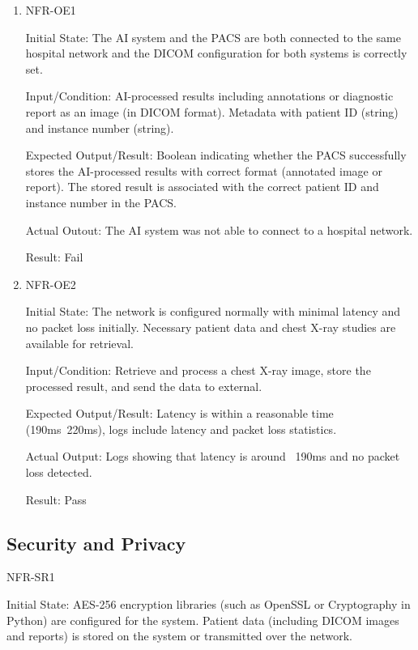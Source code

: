 \documentclass[12pt, titlepage]{article}
\begin{document}
\begin{enumerate}

  \item{NFR-OE1\\}\label{NFR-OE1}

  Initial State: The AI system and the PACS are both connected to the same hospital network and the DICOM configuration for both systems is correctly set.

  Input/Condition: AI-processed results including annotations or diagnostic report as an image (in DICOM format). Metadata with patient ID (string) and instance number (string).

  Expected Output/Result: Boolean indicating whether the PACS successfully stores the AI-processed results with correct format (annotated image or report). The stored result is associated with the correct patient ID and instance number in the PACS.

  Actual Outout: The AI system was not able to connect to a hospital network.

  Result: Fail

  \item{NFR-OE2\\}\label{NFR-OE2}

  Initial State: The network is configured normally with minimal latency and no packet loss initially. Necessary patient data and chest X-ray studies are available for retrieval.

  Input/Condition: Retrieve and process a chest X-ray image, store the processed result, and send the data to external.

  Expected Output/Result: Latency is within a reasonable time (190ms~220ms), logs include latency and packet loss statistics.

  Actual Output: Logs showing that latency is around ~190ms and no packet loss detected.

  Result: Pass

\end{enumerate}

\subsection{Security and Privacy}
\item{NFR-SR1\\}\label{NFR-SR1}

Initial State: AES-256 encryption libraries (such as OpenSSL or Cryptography in Python) are configured for the system. Patient data (including DICOM images and reports) is stored on the system or transmitted over the network.
\end{document}
